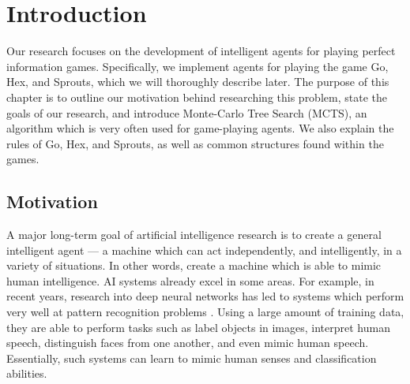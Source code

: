 %
%

\chapter{Introduction}\label{ch:intro} %


Our research focuses on the development of intelligent agents for playing perfect information games.  Specifically, we implement agents for playing the game Go, Hex, and Sprouts, which we will thoroughly describe later.  The purpose of this chapter is to outline our motivation behind researching this problem, state the goals of our research, and introduce Monte-Carlo Tree Search (MCTS), an algorithm which is very often used for game-playing agents.  We also explain the rules of Go, Hex, and Sprouts, as well as common structures found within the games.

\section{Motivation} \label{sec:motivation}
A major long-term goal of artificial intelligence research is to create a general intelligent agent --- a machine which can act independently, and intelligently, in a variety of situations.  In other words, create a machine which is able to mimic human intelligence.  AI systems already excel in some areas.  For example, in recent years, research into deep neural networks has led to systems which perform very well at pattern recognition problems \cite{imagenet}.  Using a large amount of training data, they are able to perform tasks such as label objects in images\cite{imagenet}, interpret human speech\cite{HintonDeng}, distinguish faces from one another\cite{parkhi15}, and even mimic human speech\cite{wavenet}.  Essentially, such systems can learn to mimic human senses and classification abilities.

